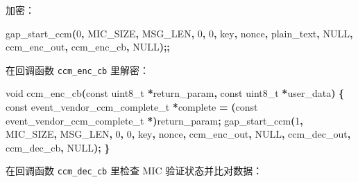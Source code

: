 \documentclass[
  12pt,
]{book}
\newenvironment{Shaded}{\begin{snugshade}}{\end{snugshade}}
\newcommand{\DataTypeTok}[1]{\textcolor[rgb]{0.13,0.29,0.53}{#1}}
\newcommand{\DecValTok}[1]{\textcolor[rgb]{0.00,0.00,0.81}{#1}}
\newcommand{\NormalTok}[1]{#1}
\newcommand{\OperatorTok}[1]{\textcolor[rgb]{0.81,0.36,0.00}{\textbf{#1}}}
\begin{document}
加密：

\begin{Shaded}
\begin{Highlighting}[]
\NormalTok{gap\_start\_ccm}\OperatorTok{(}\DecValTok{0}\OperatorTok{,}\NormalTok{ MIC\_SIZE}\OperatorTok{,}\NormalTok{ MSG\_LEN}\OperatorTok{,} \DecValTok{0}\OperatorTok{,} \DecValTok{0}\OperatorTok{,}
\NormalTok{            key}\OperatorTok{,}\NormalTok{ nonce}\OperatorTok{,}\NormalTok{ plain\_text}\OperatorTok{,}\NormalTok{ NULL}\OperatorTok{,}
\NormalTok{            ccm\_enc\_out}\OperatorTok{,}\NormalTok{ ccm\_enc\_cb}\OperatorTok{,}\NormalTok{ NULL}\OperatorTok{);;}
\end{Highlighting}
\end{Shaded}

在回调函数 \texttt{ccm\_enc\_cb} 里解密：

\begin{Shaded}
\begin{Highlighting}[]
\DataTypeTok{void}\NormalTok{ ccm\_enc\_cb}\OperatorTok{(}\DataTypeTok{const} \DataTypeTok{uint8\_t} \OperatorTok{*}\NormalTok{return\_param}\OperatorTok{,} \DataTypeTok{const} \DataTypeTok{uint8\_t} \OperatorTok{*}\NormalTok{user\_data}\OperatorTok{)}
\OperatorTok{\{}
  \DataTypeTok{const}\NormalTok{ event\_vendor\_ccm\_complete\_t }\OperatorTok{*}\NormalTok{complete }\OperatorTok{=}
    \OperatorTok{(}\DataTypeTok{const}\NormalTok{ event\_vendor\_ccm\_complete\_t }\OperatorTok{*)}\NormalTok{return\_param}\OperatorTok{;}
\NormalTok{  gap\_start\_ccm}\OperatorTok{(}\DecValTok{1}\OperatorTok{,}\NormalTok{ MIC\_SIZE}\OperatorTok{,}\NormalTok{ MSG\_LEN}\OperatorTok{,} \DecValTok{0}\OperatorTok{,} \DecValTok{0}\OperatorTok{,}
\NormalTok{        key}\OperatorTok{,}\NormalTok{ nonce}\OperatorTok{,}\NormalTok{ ccm\_enc\_out}\OperatorTok{,}\NormalTok{ NULL}\OperatorTok{,}
\NormalTok{        ccm\_dec\_out}\OperatorTok{,}\NormalTok{ ccm\_dec\_cb}\OperatorTok{,}\NormalTok{ NULL}\OperatorTok{);}
\OperatorTok{\}}
\end{Highlighting}
\end{Shaded}

在回调函数 \texttt{ccm\_dec\_cb} 里检查 MIC 验证状态并比对数据：
\end{document}
